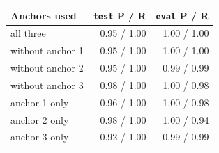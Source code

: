 \begin{tabular}{lrr}
\toprule
Anchors used & \texttt{test} P / R & \texttt{eval} P / R \\
\midrule
all three & 0.95 / 1.00 & 1.00 / 1.00 \\
without anchor 1 & 0.95 / 1.00 & 1.00 / 1.00 \\
without anchor 2 & 0.95 / 1.00 & 0.99 / 0.99 \\
without anchor 3 & 0.98 / 1.00 & 1.00 / 0.98 \\
anchor 1 only & 0.96 / 1.00 & 1.00 / 0.98 \\
anchor 2 only & 0.98 / 1.00 & 1.00 / 0.94 \\
anchor 3 only & 0.92 / 1.00 & 0.99 / 0.99 \\
\bottomrule
\end{tabular}
